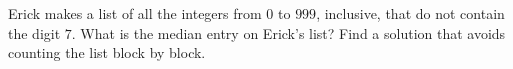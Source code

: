 Erick makes a list of all the integers from $0$ to $999$, inclusive, that do not contain the digit $7$. What is the median entry on Erick's list? Find a solution that avoids counting the list block by block.
